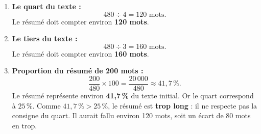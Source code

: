 \documentclass[11pt]{article}
\begin{document}
\begin{corrige}
\begin{enumerate}
\item \textbf{Le quart du texte :}
\[ 480 \div 4 = 120 \text{ mots.} \]
Le résumé doit compter environ \textbf{120 mots}.
\item \textbf{Le tiers du texte :}
\[ 480 \div 3 = 160 \text{ mots.} \]
Le résumé doit compter environ \textbf{160 mots}.
\item \textbf{Proportion du résumé de 200 mots :}
\[ \frac{200}{480} \times 100 = \frac{20\,000}{480} \approx 41,7\,\%. \]
Le résumé représente environ \textbf{41,7\,\%} du texte initial. Or le quart correspond à $25\,\%$. Comme $41,7\,\% > 25\,\%$, le résumé est \textbf{trop long} : il ne respecte pas la consigne du quart. Il aurait fallu environ 120 mots, soit un écart de 80 mots en trop.
\end{enumerate}
\end{corrige}
\end{document}

